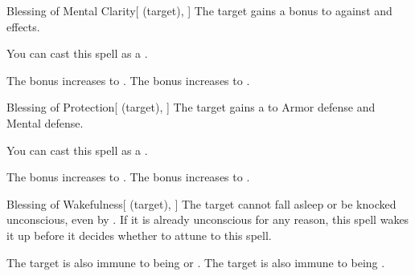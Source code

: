 \lowercase{\hypertarget{spell:Blessing of Mental Clarity}{}}\label{spell:Blessing of Mental Clarity}
\begin{attuneability}[Rank 4]{\hypertarget{spell:Blessing of Mental Clarity}{Blessing of Mental Clarity}}[ (target), ]
The target gains a  bonus to  against  and  effects.

You can cast this spell as a .

\rankline
{} The bonus increases to .
 The bonus increases to .

\end{attuneability}
\vspace{0.25em}



\lowercase{\hypertarget{spell:Blessing of Protection}{}}\label{spell:Blessing of Protection}
\begin{attuneability}[Rank 4]{\hypertarget{spell:Blessing of Protection}{Blessing of Protection}}[ (target), ]
The target gains a   to Armor defense and Mental defense.

You can cast this spell as a .

\rankline
{} The bonus increases to .
 The bonus increases to .

\end{attuneability}
\vspace{0.25em}



\lowercase{\hypertarget{spell:Blessing of Wakefulness}{}}\label{spell:Blessing of Wakefulness}
\begin{attuneability}[Rank 4]{\hypertarget{spell:Blessing of Wakefulness}{Blessing of Wakefulness}}[ (target), ]
The target cannot fall asleep or be knocked unconscious, even by .
If it is already unconscious for any reason, this spell wakes it up before it decides whether to attune to this spell.


\rankline
{} The target is also immune to being  or .
 The target is also immune to being .

\end{attuneability}
\vspace{0.25em}



